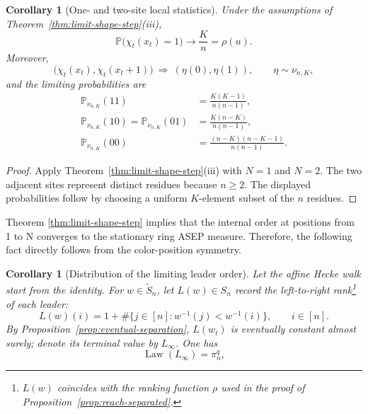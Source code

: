 \documentclass[11pt,a4paper]{amsart}
\newtheorem{corollary}[theorem]{Corollary}
\theoremstyle{definition}
\theoremstyle{remark}
\numberwithin{equation}{section}
\newcommand{\Pp}{\mathbb P}
\newcommand{\wtS}{\widetilde S_n}
\newcommand{\Law}{\operatorname{Law}}
\begin{document}
	\begin{corollary}[One- and two-site local statistics]
		\label{cor:two-site-local-equilibrium}
		Under the assumptions of Theorem~\ref{thm:limit-shape-step}(iii),
		\begin{equation}\label{eq:one-point-limit}
			\Pp\bigl(\chi_t(x_t)=1\bigr)\longrightarrow\frac Kn=\rho(u).
		\end{equation}
		Moreover,
		\begin{equation}\label{eq:two-site-local-equilibrium}
			\bigl(\chi_t(x_t),\chi_t(x_t+1)\bigr)
			\ \Longrightarrow\ (\eta(0),\eta(1)),
			\qquad \eta\sim\nu_{n,K},
		\end{equation}
		and the limiting probabilities are
		\begin{align}
			\Pp_{\nu_{n,K}}(11)
			&=\frac{K(K-1)}{n(n-1)},
			\label{eq:adjacent-two-point-limit}\\
			\Pp_{\nu_{n,K}}(10)
			=\Pp_{\nu_{n,K}}(01)
			&=\frac{K(n-K)}{n(n-1)},
			\label{eq:adjacent-mixed-two-point-limit}\\
			\Pp_{\nu_{n,K}}(00)
			&=\frac{(n-K)(n-K-1)}{n(n-1)}.
			\label{eq:adjacent-empty-two-point-limit}
		\end{align}
	\end{corollary}
	
	\begin{proof}
		Apply Theorem~\ref{thm:limit-shape-step}(iii) with $N=1$ and $N=2$.
		The two adjacent sites represent distinct residues because $n\ge2$.
		The displayed probabilities follow by choosing a uniform $K$-element subset
		of the $n$ residues.
	\end{proof}
	
	Theorem \ref{thm:limit-shape-step} implies that the internal order at positions from 1 to N converges to the stationary ring ASEP measure. Therefore, the following fact directly follows from the color-position symmetry.
	\begin{corollary}[Distribution of the limiting leader order]
		\label{rem:leader-order-distribution}
		Let the affine Hecke walk start from the identity. For $w\in\wtS$, let $L(w)\in S_n$ record the left-to-right rank\footnote{ $L(w)$ coincides with the ranking function $\rho$ used in the proof of Proposition~\ref{prop:reach-separated}.} of each
		leader:
		\begin{equation}\label{eq:leader-rank-permutation}
			L(w)(i)=1+\#\{j\in[n]:w^{-1}(j)<w^{-1}(i)\},
			\qquad i\in[n].
		\end{equation}
		By Proposition~\ref{prop:eventual-separation}, $L(w_t)$ is eventually
		constant almost surely; denote its terminal value by $L_\infty$. One has
		\begin{equation}\label{eq:leader-order-stationary-law}
			\Law(L_\infty)=\pi_n^q,
		\end{equation}
	\end{corollary}
	
\end{document}
